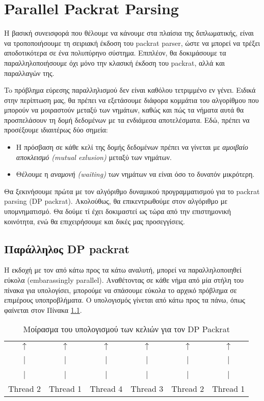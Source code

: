 \chapter{ Parallel Packrat Parsing }
\label{ch:parallel}

Η βασική συνεισφορά που θέλουμε να κάνουμε στα πλαίσια της διπλωματικής, είναι να τροποποιήσουμε τη σειριακή έκδοση του packrat parser, ώστε να μπορεί να τρέξει αποδοτικότερα σε ένα πολυπύρηνο σύστημα.
Επιπλέον, θα δοκιμάσουμε τα παραλληλοποιήσουμε όχι μόνο την κλασική έκδοση του packrat, αλλά και παραλλαγών της. %

To πρόβλημα εύρεσης παραλληλισμού δεν είναι καθόλου τετριμμένο εν γένει. 
Ειδικά στην περίπτωση μας, θα πρέπει να εξετάσουμε διάφορα κομμάτια του αλγορίθμου που μπορούν να μοιραστούν μεταξύ των νημάτων, καθώς και πώς τα νήματα αυτά θα προσπελάσουν τη δομή δεδομένων με τα ενδιάμεσα αποτελέσματα.
Εδώ, πρέπει να προσέξουμε ιδιαιτέρως δύο σημεία:

\begin{itemize}
	\item Η πρόσβαση σε κάθε κελί της δομής δεδομένων πρέπει να γίνεται με \textit{αμοιβαίο αποκλεισμό (mutual exlusion)} μεταξύ των νημάτων.
	\item Θέλουμε η \textit{αναμονή (waiting)} των νημάτων να είναι όσο το δυνατόν μικρότερη.
\end{itemize}

Θα ξεκινήσουμε πρώτα με τον αλγόριθμο δυναμικού προγραμματισμού για το packrat parsing (DP packrat).
Ακολούθως, θα επικεντρωθούμε στον αλγόριθμο με υπομνηματισμό.
Θα δούμε τί έχει δοκιμαστεί ως τώρα από την επιστημονική κοινότητα, ενώ θα επιχειρήσουμε και δικές μας προσεγγίσεις. %

\section{Παράλληλος DP packrat}

Η εκδοχή με τον από κάτω προς τα κάτω αναλυτή, μπορεί να παραλληλοποιηθεί εύκολα (embarassingly parallel). 
Αναθέτοντας σε κάθε νήμα από μία στήλη του πίνακα για υπολογίσει, μπορούμε να σπάσουμε εύκολα το αρχικό πρόβλημα σε επιμέρους υποπροβλήματα.
Ο υπολογισμός γίνεται από κάτω προς τα πάνω, όπως φαίνεται στον Πίνακα \ref{table:dp}.

\begin{table}[]
  \centering
\begin{tabular}{|c|c|c|c|c|c|}
\hline
 &  &  &  &  & \\ \hline
 $\uparrow$& $\uparrow$ & $\uparrow$ & $\uparrow$ & $\uparrow$ & $\uparrow$ \\ \hline
 | & | & | & | & | & | \\ \hline
 | & | & | & | & | & | \\ \hline
 Thread 2 & Thread 1 & Thread 4 & Thread 3 & Thread 2 & Thread 1  \\ \hline
\end{tabular}
\caption{Μοίρασμα του υπολογισμού των κελιών για τον DP Packrat}
  \label{table:dp}
\end{table}

